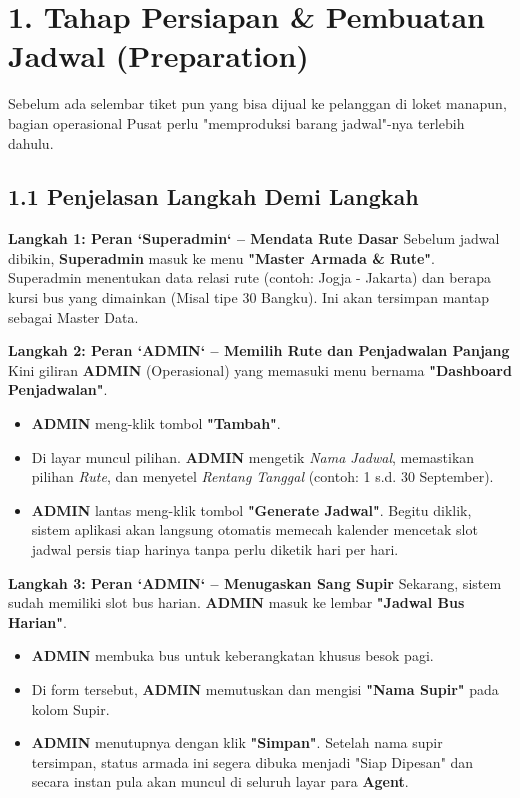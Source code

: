 \documentclass[11pt,a4paper]{article}
\begin{document}
\clearpage
\section{1. Tahap Persiapan \& Pembuatan Jadwal (Preparation)}
Sebelum ada selembar tiket pun yang bisa dijual ke pelanggan di loket manapun, bagian operasional Pusat perlu "memproduksi barang jadwal"-nya terlebih dahulu.

\subsection{1.1 Penjelasan Langkah Demi Langkah}
\textbf{Langkah 1: Peran `Superadmin` -- Mendata Rute Dasar}
Sebelum jadwal dibikin, \textbf{Superadmin} masuk ke menu \textbf{"Master Armada \& Rute"}. Superadmin menentukan data relasi rute (contoh: Jogja - Jakarta) dan berapa kursi bus yang dimainkan (Misal tipe 30 Bangku). Ini akan tersimpan mantap sebagai Master Data.

\textbf{Langkah 2: Peran `ADMIN` -- Memilih Rute dan Penjadwalan Panjang}
Kini giliran \textbf{ADMIN} (Operasional) yang memasuki menu bernama \textbf{"Dashboard Penjadwalan"}.
\begin{itemize}[leftmargin=1.5cm]
    \item \textbf{ADMIN} meng-klik tombol \textbf{"Tambah"}.
    \item Di layar muncul pilihan. \textbf{ADMIN} mengetik \textit{Nama Jadwal}, memastikan pilihan \textit{Rute}, dan menyetel \textit{Rentang Tanggal} (contoh: 1 s.d. 30 September).
    \item \textbf{ADMIN} lantas meng-klik tombol \textbf{"Generate Jadwal"}. Begitu diklik, sistem aplikasi akan langsung otomatis memecah kalender mencetak slot jadwal persis tiap harinya tanpa perlu diketik hari per hari.
\end{itemize}

\textbf{Langkah 3: Peran `ADMIN` -- Menugaskan Sang Supir}
Sekarang, sistem sudah memiliki slot bus harian. \textbf{ADMIN} masuk ke lembar \textbf{"Jadwal Bus Harian"}.
\begin{itemize}[leftmargin=1.5cm]
    \item \textbf{ADMIN} membuka bus untuk keberangkatan khusus besok pagi.
    \item Di form tersebut, \textbf{ADMIN} memutuskan dan mengisi \textbf{"Nama Supir"} pada kolom Supir.
    \item \textbf{ADMIN} menutupnya dengan klik \textbf{"Simpan"}. Setelah nama supir tersimpan, status armada ini segera dibuka menjadi "Siap Dipesan" dan secara instan pula akan muncul di seluruh layar para \textbf{Agent}.
\end{itemize}
\end{document}

